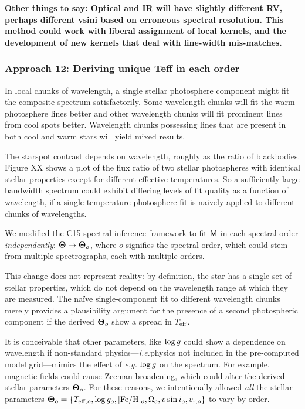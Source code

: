 \documentclass[onecolumn]{emulateapj}%
\newcommand{\iancze}{{\sc C15 }}
\begin{document}
\textbf{Other things to say: Optical and IR will have slightly different RV, perhaps different vsini based on erroneous spectral resolution.  This method could work with liberal assignment of local kernels, and the development of new kernels that deal with line-width mis-matches.}

\subsubsection{Approach 12: Deriving unique Teff in each order}

In local chunks of wavelength, a single stellar photosphere component might fit the composite spectrum satisfactorily.  Some wavelength chunks will fit the warm photosphere lines better and other wavelength chunks will fit prominent lines from cool spots better.  Wavelength chunks possessing lines that are present in both cool and warm stars will yield mixed results.

The starspot contrast depends on wavelength, roughly as the ratio of blackbodies.  Figure XX shows a plot of the flux ratio of two stellar photospheres with identical stellar properties except for different effective temperatures.  So a sufficiently large bandwidth spectrum could exhibit differing levels of fit quality as a function of wavelength, if a single temperature photosphere fit is naively applied to different chunks of wavelengths.  

We modified the \iancze spectral inference framework to fit $\mathsf{M}$ in each spectral order \emph{independently}: ${\bm \Theta} \rightarrow {\bm \Theta}_o$, where $o$ signifies the spectral order, which could stem from multiple spectrographs, each with multiple orders.  

This change does not represent reality: by definition, the star has a single set of stellar properties, which do not depend on the wavelength range at which they are measured.  The na\"ive single-component fit to different wavelength chunks merely provides a plausibility argument for the presence of a second photospheric component if the derived ${\bm \Theta}_o$ show a spread in $T_\textrm{eff}$.  

It is conceivable that other parameters, like $\log g$ could show a dependence on wavelength if non-standard physics---\emph{i.e.}physics not included in the pre-computed model grid---mimics the effect of \emph{e.g.} $\log g$ on the spectrum.  For example, magnetic fields could cause Zeeman broadening, which could alter the derived stellar parameters ${\bm \Theta}_o$.  For these reasons, we intentionally allowed \emph{all} the stellar parameters ${\bm \Theta}_o = \{T_{\mathrm{eff},o}, \log{g_o}, [{\rm Fe}/{\rm H}]_o, \Omega_{o}, v\sin{i}_o, v_{r,o}\}$ to vary by order.  
\end{document}
